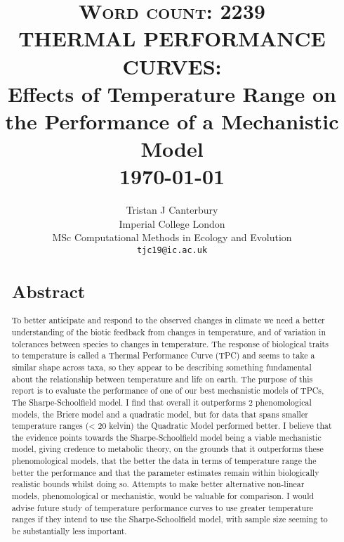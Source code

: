 \documentclass[fontsize=11pt]{scrartcl}\usepackage[]{graphicx}\usepackage[]{color}
\title{	\normalsize \textsc{Word count: 2239} 	%
			\HRule{0.5pt} \\						%
			\LARGE \textbf{\uppercase{Thermal Performance Curves:\\} 
                      {Effects of Temperature Range on the Performance of a Mechanistic Model}}	%
			\HRule{2pt} \\ [0.5cm]		%
			\normalsize \today			%
		}
\author{
		Tristan J Canterbury\\	
		Imperial College London\\	
		MSc Computational Methods in Ecology and Evolution\\
        \texttt{tjc19@ic.ac.uk} \\
}
\makeatletter
\def\printtitle{%
    {\centering \@title\par}}
\def\printauthor{%
    {\centering \large \@author}}
\makeatother
\begin{document}
\linenumbers
    \thispagestyle{empty}		%

  \printtitle					%
      \vfill
  \printauthor				%
  \newpage
  \setcounter{page}{1}

  \begin{abstract}
  \section{Abstract} 
  To better anticipate and respond to the observed changes in climate
  we need a better understanding of the biotic feedback from changes in temperature, and of variation
  in tolerances between species to changes in temperature. The response of biological traits to temperature is called a 
  Thermal Performance Curve (TPC) and seems to take a similar shape across taxa, so they appear to be describing something
  fundamental about the relationship between temperature and life on earth.
  The purpose of this report is to evaluate the performance of one of our best mechanistic models of TPCs, The
  Sharpe-Schoolfield model. I find that overall it outperforms 2 phenomological models, the Briere model and a quadratic model, 
  but for data that spans smaller temperature ranges (< 20 kelvin) the Quadratic Model performed better.
  I believe that the evidence points towards the Sharpe-Schoolfield model being a viable mechanistic model, giving credence
  to metabolic theory, on the grounds that it outperforms 
  these phenomological models, that the better the data in terms of temperature range the better the performance 
  and that the parameter estimates 
  remain within biologically realistic bounds whilst doing so. Attempts to make better alternative non-linear models, 
  phenomological or mechanistic, would be valuable for comparison. I would advise future study of temperature performance curves
  to use greater temperature ranges if they intend to use the Sharpe-Schoolfield model, with sample size seeming to be substantially
  less important.

  \end{abstract}
\end{document}
